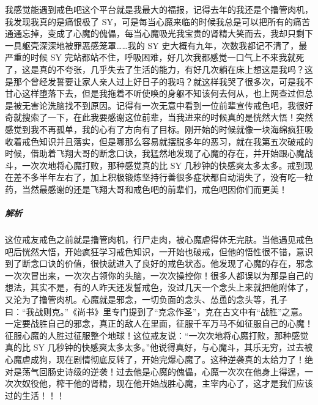 \begin{case}
    我感觉能遇到戒色吧这个平台就是我最大的福报，记得去年的我还是个撸管肉机，我发现我真的是痛恨极了 SY，可是每当心魔来临的时候我总是可以把所有的痛苦通通忘掉，变成了心魔的傀儡，每当心魔吸光我宝贵的肾精大笑而去，我却只剩下一具躯壳深深地被罪恶感笼罩……我的 SY 史大概有九年，次数我都记不清了，最严重的时候 SY 完站都站不住，呼吸困难，好几次我都感觉一口气上不来我就死了，这是真的不夸张，几乎失去了生活的能力，有好几次躺在床上想这是我吗？这是那个曾经发誓要让家人亲人过上好日子的我吗？就这样我哭了很多次，可是我不甘心这样堕落下去，但是我拖着不听使唤的身躯不知该何去何从，也上网查过但总是被无害论洗脑找不到原因。记得有一次无意中看到一位前辈宣传戒色吧，我很好奇就搜索了一下，在此我要感谢这位前辈，当我进来的时候真的是恍然大悟！突然感觉到我不再孤单，我的心有了方向有了目标。刚开始的时候就像一块海绵疯狂吸收着戒色知识并且落实，但是哪那么容易就摆脱多年的恶习，就在我第五次破戒的时候，借助着飞翔大哥的断念口诀，我猛然地发现了心魔的存在，并开始跟心魔战斗，一次次地将心魔打败，那种感觉真的比 SY 几秒钟的快感爽太多太多。戒到现在差不多半年左右了，加上积极锻炼坚持行善很多症状都自动消失了，没有吃一粒药，当然最感谢的还是飞翔大哥和戒色吧的前辈们，戒色吧因你们而更美！
    \subparagraph{解析} 这位戒友戒色之前就是撸管肉机，行尸走肉，被心魔虐得体无完肤。当他遇见戒色吧后恍然大悟，开始疯狂学习戒色知识，一开始也破戒，但他的悟性很不错，意识到了断念口诀的价值，很快就进入了良好的戒色状态。他发现了心魔的存在，邪念一次次冒出来，一次次占领你的头脑，一次次操控你！很多人都误以为那是自己的想法，其实不是，有的人昨天还发誓戒色，没过几天一个念头上来就把他附体了，又沦为了撸管肉机。心魔就是邪念，一切负面的念头、怂恿的念头等，孔子曰：“我战则克。”《尚书》里专门提到了“克念作圣”，克在古文中有“战胜”之意。一定要战胜自己的邪念，真正的敌人在里面，征服千军万马不如征服自己的心魔！征服心魔的人胜过征服整个地球！这位戒友说：“一次次地将心魔打败，那种感觉真的比 SY 几秒钟的快感爽太多太多。”他说得真好，与心魔斗，其乐无穷，过去被心魔虐成狗，现在剧情彻底反转了，开始完爆心魔了。这种逆袭真的太给力了！绝对是荡气回肠史诗级的逆袭！过去他是心魔的傀儡，心魔一次次在他身上得逞，一次次奴役他，榨干他的肾精，现在他开始战胜心魔，主宰内心了，这才是我们应该过的生活！！！
\end{case}

